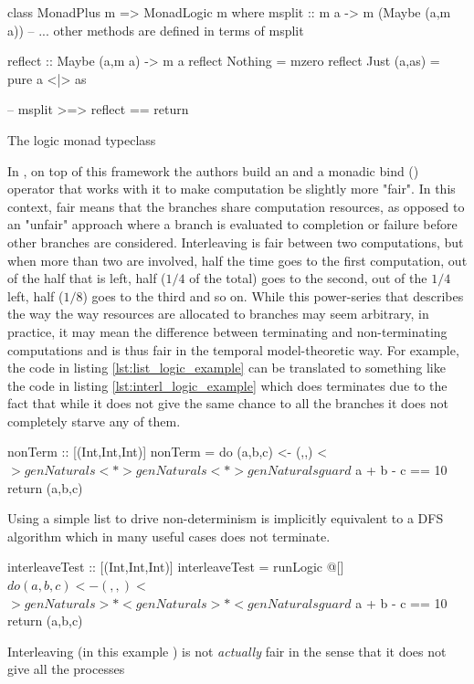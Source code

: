 \begin{code}
\begin{haskellcode}
class MonadPlus m => MonadLogic m where
  msplit :: m a -> m (Maybe (a,m a))
  -- ... other methods are defined in terms of msplit

reflect :: Maybe (a,m a) -> m a
reflect Nothing = mzero
reflect Just (a,as) = pure a <|> as

-- msplit >=> reflect == return
\end{haskellcode}
  \caption{\label{lst:monad_logic}The logic monad typeclass}
\end{code}

In \cite{kiselyovBacktrackingInterleavingTerminating}, on top of this
framework the authors build an  and a monadic bind
(\hask{>>-}) operator that works with it to make computation be
slightly more "fair". In this context, fair means that the branches
share computation resources, as opposed to an "unfair" approach where
a branch is evaluated to completion or failure before other branches
are considered. Interleaving is fair between two computations, but
when more than two are involved, half the time goes to the first
computation, out of the half that is left, half (\(1/4\) of the total)
goes to the second, out of the \(1/4\) left, half (\(1/8\)) goes to
the third and so on. While this power-series that describes the way
the way resources are allocated to branches may seem arbitrary, in
practice, it may mean the difference between terminating and
non-terminating computations and is thus fair in the temporal
model-theoretic way. For example, the code in listing
\ref{lst:list_logic_example} can be translated to something like the
code in listing \ref{lst:interl_logic_example} which does terminates
due to the fact that while it does not give the same chance to all the
branches it does not completely starve any of them.

\begin{code}
\begin{haskellcode}
nonTerm :: [(Int,Int,Int)]
nonTerm = do
  (a,b,c) <- (,,) <$> genNaturals <*> genNaturals <*> genNaturals
  guard $ a + b - c == 10
  return (a,b,c)
\end{haskellcode}
  \caption{\label{lst:list_logic_example}Using a simple list to drive
    non-determinism is implicitly equivalent to a DFS algorithm which
    in many useful cases does not terminate.}
\end{code}

\begin{code}
\begin{haskellcode}
interleaveTest :: [(Int,Int,Int)]
interleaveTest = runLogic @[] $ do
  (a,b,c) <-  (,,) <$$> genNaturals >*< genNaturals >*< genNaturals
  guard $ a + b - c == 10
  return (a,b,c)
\end{haskellcode}
  \caption{\label{lst:interl_logic_example}Interleaving (in this
    example \hask{>*<}) is not \emph{actually} fair in the sense that
    it does not give all the processes}
\end{code}

